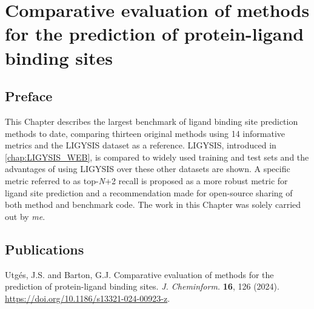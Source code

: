 \chapter{Comparative evaluation of methods for the prediction of protein-ligand binding sites}
\label{chap:LBS_COMP}

\section*{Preface}

This Chapter describes the largest benchmark of ligand binding site prediction methods to date, comparing thirteen original methods using 14 informative metrics and the LIGYSIS dataset as a reference. LIGYSIS, introduced in \autoref{chap:LIGYSIS_WEB}, is compared to widely used training and test sets and the advantages of using LIGYSIS over these other datasets are shown. A specific metric referred to as top-\textit{N}+2 recall is proposed as a more robust metric for ligand site prediction and a recommendation made for open-source sharing of both method and benchmark code. The work in this Chapter was solely carried out by \textit{me}.

\section*{Publications}

Utgés, J.S. and Barton, G.J. Comparative evaluation of methods for the prediction of protein-ligand binding sites. \textit{J. Cheminform.} \textbf{16}, 126 (2024). \url{https://doi.org/10.1186/s13321-024-00923-z}.



